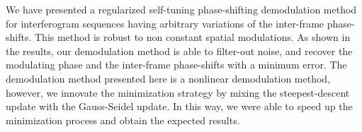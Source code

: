 We have presented a regularized self-tuning phase-shifting 
demodulation method for interferogram sequences having arbitrary variations of 
the inter-frame 
phase-shifts. This method is robust to non constant spatial modulations. As shown 
in the results, our demodulation method is able to filter-out noise, and recover 
the modulating phase and the inter-frame phase-shifts with a minimum error. The 
demodulation method presented here is a nonlinear demodulation method, however, 
we innovate the minimization strategy by mixing the steepest-descent update with 
the Gauss-Seidel update. In this way, we were able to speed up the minimization 
process and obtain the expected results.




%
%












